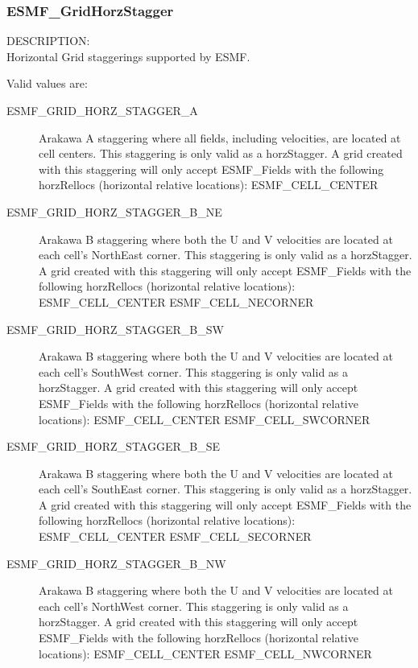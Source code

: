 
\subsubsection{ESMF\_GridHorzStagger}

{\sf DESCRIPTION:\\}
Horizontal Grid staggerings supported by ESMF.

Valid values are:
\begin{description}
   \item [ESMF\_GRID\_HORZ\_STAGGER\_A]
         Arakawa A staggering where all fields, including velocities, are
         located at cell centers.  This staggering is only valid as a horzStagger.
         A grid created with this staggering will only accept ESMF\_Fields with
         the following horzRellocs (horizontal relative locations):
             ESMF\_CELL\_CENTER

   \item [ESMF\_GRID\_HORZ\_STAGGER\_B\_NE]
         Arakawa B staggering where both the U and V velocities are located at
         each cell's NorthEast corner.  This staggering is only valid as a
         horzStagger.  A grid created with this staggering will only accept
         ESMF\_Fields with the following horzRellocs (horizontal relative locations):
             ESMF\_CELL\_CENTER
             ESMF\_CELL\_NECORNER

   \item [ESMF\_GRID\_HORZ\_STAGGER\_B\_SW]
         Arakawa B staggering where both the U and V velocities are located at
         each cell's SouthWest corner.  This staggering is only valid as a 
         horzStagger.  A grid created with this staggering will only accept
         ESMF\_Fields with the following horzRellocs (horizontal relative locations):
             ESMF\_CELL\_CENTER
             ESMF\_CELL\_SWCORNER

   \item [ESMF\_GRID\_HORZ\_STAGGER\_B\_SE]
         Arakawa B staggering where both the U and V velocities are located at
         each cell's SouthEast corner.  This staggering is only valid as a 
         horzStagger.  A grid created with this staggering will only accept
         ESMF\_Fields with the following horzRellocs (horizontal relative locations):
             ESMF\_CELL\_CENTER
             ESMF\_CELL\_SECORNER

   \item [ESMF\_GRID\_HORZ\_STAGGER\_B\_NW]
         Arakawa B staggering where both the U and V velocities are located at
         each cell's NorthWest corner.  This staggering is only valid as a 
         horzStagger.  A grid created with this staggering will only accept
         ESMF\_Fields with the following horzRellocs (horizontal relative locations):
             ESMF\_CELL\_CENTER
             ESMF\_CELL\_NWCORNER


\end{description}
